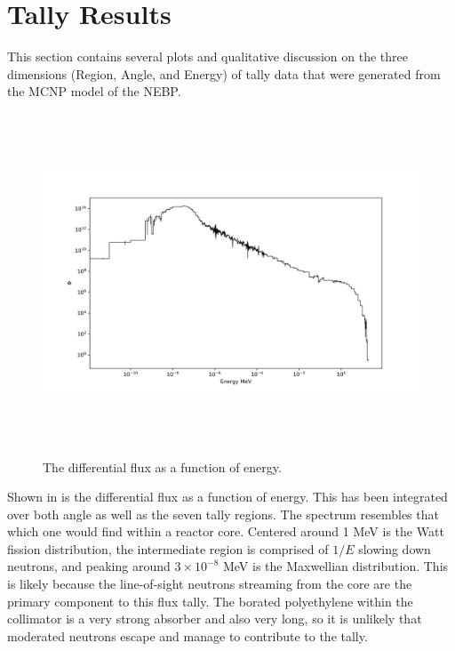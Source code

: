 \section{Tally Results}

This section contains several plots and qualitative discussion on the three dimensions (Region, Angle, and Energy) of tally data that were generated from the MCNP model of the NEBP.


\begin{figure}[htb]
\centering
\includegraphics[height=4in]{tex/figures/flux_erg.png}
\caption[Flux vs. Energy]{The differential flux as a function of energy.}
\label{fig:flux_erg}
\end{figure}

Shown in  is the differential flux as a function of energy.
This has been integrated over both angle as well as the seven tally regions.
The spectrum resembles that which one would find within a reactor core.
Centered around 1 MeV is the Watt fission distribution, the intermediate region is comprised of $1/E$ slowing down neutrons, and peaking around $3 \times 10^{-8}$ MeV is the Maxwellian distribution.
This is likely because the line-of-sight neutrons streaming from the core are the primary component to this flux tally.
The borated polyethylene within the collimator is a very strong absorber and also very long, so it is unlikely that moderated neutrons escape and manage to contribute to the tally.

